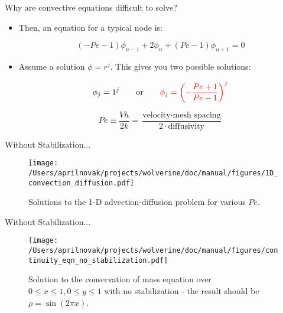 \documentclass{beamer}
\begin{document}
\begin{frame}{Why are convective equations difficult to solve?}
\begin{itemize}
\item Then, an equation for a typical node is:

\begin{equation}
\label{eq:1D_nodal_eq}
(-Pe-1)\phi_{n-1}+2\phi_n+(Pe-1)\phi_{n+1}=0
\end{equation}

\item Assume a solution \(\phi=r^j\). This gives you two possible solutions:

\begin{equation}
\phi_j=1^j\quad\quad\text{or}\quad\quad\color{red}\phi_j=\left(-\frac{Pe+1}{Pe-1}\right)^j\color{black}
\end{equation}

\begin{equation}
Pe\equiv\frac{Vh}{2k}=\frac{\text{velocity}\cdot\text{mesh spacing}}{2\cdot\text{diffusivity}}
\end{equation}

\end{itemize}
\end{frame}

\begin{frame}{Without Stabilization...}

\begin{figure}[H]
  \centering
  \texttt{[image: /Users/aprilnovak/projects/wolverine/doc/manual/figures/1D\_convection\_diffusion.pdf]}
  \caption{Solutions to the 1-D advection-diffusion problem for various \(Pe\).}
\end{figure}

\end{frame}


\begin{frame}{Without Stabilization...}

\begin{figure}[H]
  \centering
  \texttt{[image: /Users/aprilnovak/projects/wolverine/doc/manual/figures/continuity\_eqn\_no\_stabilization.pdf]}
  \caption{Solution to the conservation of mass equation over \(0\leq x\leq 1, 0\leq y\leq 1\) with no stabilization - the result should be \(\rho=\sin{(2\pi x)}\).}
\end{figure}

\end{frame}
\end{document}
